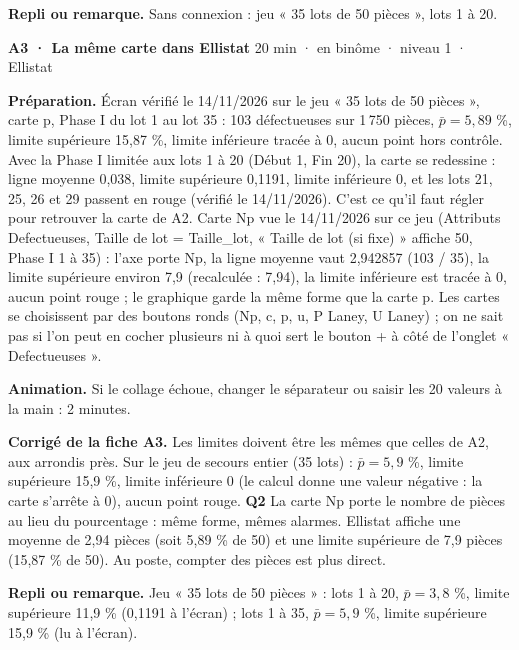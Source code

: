 {\small\textbf{Repli ou remarque.} Sans connexion : jeu « 35 lots de 50 pièces », lots 1 à 20.}\par
\vspace{3pt}
\begin{tcolorbox}[act]\textbf{A3 · La même carte dans Ellistat} \hfill {\small 20 min · en binôme · niveau 1 · Ellistat}\end{tcolorbox}
\textbf{Préparation.} Écran vérifié le 14/11/2026 sur le jeu « 35 lots de 50 pièces », carte p, Phase I du lot 1 au lot 35 : 103 défectueuses sur 1\,750 pièces, $\bar p = 5{,}89$ \%, limite supérieure 15,87 \%, limite inférieure tracée à 0, aucun point hors contrôle. Avec la Phase I limitée aux lots 1 à 20 (Début 1, Fin 20), la carte se redessine : ligne moyenne 0,038, limite supérieure 0,1191, limite inférieure 0, et les lots 21, 25, 26 et 29 passent en rouge (vérifié le 14/11/2026). C'est ce qu'il faut régler pour retrouver la carte de A2. Carte Np vue le 14/11/2026 sur ce jeu (Attributs Defectueuses, Taille de lot = Taille\_lot, « Taille de lot (si fixe) » affiche 50, Phase I 1 à 35) : l'axe porte Np, la ligne moyenne vaut 2,942857 (103 / 35), la limite supérieure environ 7,9 (recalculée : 7,94), la limite inférieure est tracée à 0, aucun point rouge ; le graphique garde la même forme que la carte p. Les cartes se choisissent par des boutons ronds (Np, c, p, u, P Laney, U Laney) ; on ne sait pas si l'on peut en cocher plusieurs ni à quoi sert le bouton + à côté de l'onglet « Defectueuses ».\par
\textbf{Animation.} Si le collage échoue, changer le séparateur ou saisir les 20 valeurs à la main : 2 minutes.\par
\textbf{\color{ok}Corrigé de la fiche A3.} Les limites doivent être les mêmes que celles de A2, aux arrondis près. Sur le jeu de secours entier (35 lots) : $\bar p = 5{,}9$ \%, limite supérieure 15,9 \%, limite inférieure 0 (le calcul donne une valeur négative : la carte s'arrête à 0), aucun point rouge. \textbf{Q2} La carte Np porte le nombre de pièces au lieu du pourcentage : même forme, mêmes alarmes. Ellistat affiche une moyenne de 2,94 pièces (soit 5,89 \% de 50) et une limite supérieure de 7,9 pièces (15,87 \% de 50). Au poste, compter des pièces est plus direct.\par
{\small\textbf{Repli ou remarque.} Jeu « 35 lots de 50 pièces » : lots 1 à 20, $\bar p = 3{,}8$ \%, limite supérieure 11,9 \% (0,1191 à l'écran) ; lots 1 à 35, $\bar p = 5{,}9$ \%, limite supérieure 15,9 \% (lu à l'écran).}\par
